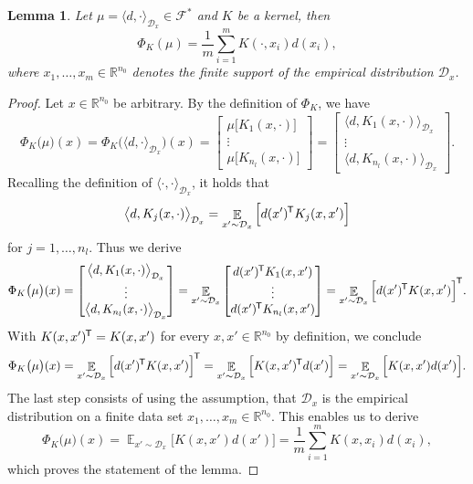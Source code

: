 \documentclass[11pt, a4paper]{article}
\newtheorem{lemma}[theorem]{Lemma}
\newcommand{\R}{\mathbb{R}}
\newcommand{\D}{\mathcal{D}}
\newcommand{\F}{\mathcal{F}}
\newcommand*{\tr}{^{\mkern-1.5mu\mathsf{T}}}
\DeclareMathOperator*{\E}{\mathbb{E}}
\begin{document}
\begin{lemma} \label{lem:phi}
Let $\mu = \langle d, \cdot \rangle_{\D_x} \in \F^*$ and $K$ be a kernel, then
\[ \Phi_K(\mu) = \frac{1}{m}\sum_{i=1}^{m} K(\cdot,x_i)d(x_i), \]
where $x_1, \dots, x_m \in \R^{n_0}$ denotes the finite support of the empirical distribution $\D_x$.
\end{lemma}

\begin{proof}
Let $x \in \R^{n_0}$ be arbitrary. By the definition of $\Phi_K$, we have
\[ \Phi_K \big ( \mu \big )(x) = \Phi_K \Big ( \langle d, \cdot \rangle_{\D_x} \Big )(x) = \begin{bmatrix} \mu \big [K_1(x,\cdot) \big ] \\ \vdots \\ \mu \big [ K_{n_l}(x,\cdot) \big ] \end{bmatrix} = \begin{bmatrix} \big \langle d, K_1(x,\cdot) \big \rangle_{\D_x} \\ \vdots \\ \big \langle d, K_{n_l}(x,\cdot) \big \rangle_{\D_x} \end{bmatrix}. \]
Recalling the definition of $\langle \cdot , \cdot \rangle_{\D_x}$, it holds that
\[ \big \langle d, K_j(x,\cdot) \big \rangle_{\D_x} = \E_{x' \sim \D_x} \Big [ d(x')\tr K_j(x,x') \Big ] \]
for $j = 1, \dots, n_l$. Thus we derive
\[ \Phi_K \big ( \mu \big )(x) = \begin{bmatrix} \big \langle d, K_1(x,\cdot) \big \rangle_{\D_x} \\ \vdots \\ \big \langle d, K_{n_l}(x,\cdot) \big \rangle_{\D_x} \end{bmatrix} = \E_{x' \sim \D_x} \begin{bmatrix} d(x')\tr K_{1}(x,x') \\ \vdots \\ d(x')\tr K_{n_l}(x,x') \end{bmatrix} = \E_{x' \sim \D_x} \Big [ d(x')\tr  K(x,x') \Big ]\tr . \]
With $K(x,x')\tr  = K(x,x')$ for every $x,x' \in \R^{n_0}$ by definition, we conclude
\[ \Phi_K \big ( \mu \big )(x) = \E_{x' \sim \D_x} \Big [ d(x')\tr  K(x,x') \Big ]\tr  = \E_{x' \sim \D_x} \Big [ K(x,x')\tr d(x') \Big ] = \E_{x' \sim \D_x} \Big [ K(x,x')d(x') \Big ]. \]
The last step consists of using the assumption, that $\D_x$ is the empirical distribution on a finite data set $x_1, \dots, x_m \in \R^{n_0}$. This enables us to derive
\[ \Phi_K \big ( \mu \big )(x) = \E_{x' \sim \D_x} \Big [ K(x,x')d(x') \Big ] = \frac{1}{m}\sum_{i=1}^{m} K(x,x_i)d(x_i), \]
which proves the statement of the lemma.
\end{proof}
\end{document}
